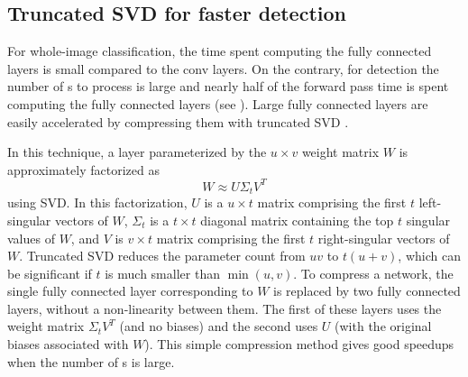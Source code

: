 \subsection{Truncated SVD for faster detection}
For whole-image classification, the time spent computing the fully connected layers is small compared to the conv layers.
On the contrary, for detection the number of {\roi}s to process is large and nearly half of the forward pass time is spent computing the fully connected layers (see ).
Large fully connected layers are easily accelerated by compressing them with truncated SVD \cite{Denton2014SVD,Xue2013svd}.

In this technique, a layer parameterized by the $u \times v$ weight matrix $W$ is approximately factorized as
\begin{equation}
  W \approx U \Sigma_t V^T
\end{equation}
using SVD.
In this factorization, $U$ is a $u \times t$ matrix comprising the first $t$ left-singular vectors of $W$, $\Sigma_t$ is a $t \times t$ diagonal matrix containing the top $t$ singular values of $W$, and $V$ is $v \times t$ matrix comprising the first $t$ right-singular vectors of $W$.
Truncated SVD reduces the parameter count from $uv$ to $t(u + v)$, which can be significant if $t$ is much smaller than $\min(u, v)$.
To compress a network, the single fully connected layer corresponding to $W$ is replaced by two fully connected layers, without a non-linearity between them.
The first of these layers uses the weight matrix $\Sigma_t V^T$ (and no biases) and the second uses $U$ (with the original biases associated with $W$).
This simple compression method gives good speedups when the number of {\roi}s is large.


